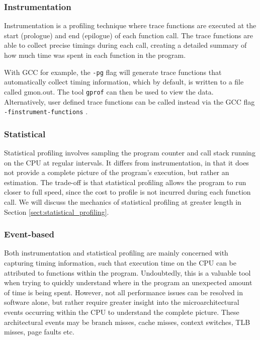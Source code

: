 \subsubsection{Instrumentation}

Instrumentation is a profiling technique where trace functions are executed at the start (prologue) and end (epilogue) of each function call. The trace functions are able to collect precise timings during each call, creating a detailed summary of how much time was spent in each function in the program.

With GCC for example, the \texttt{-pg} flag will generate trace functions that automatically collect timing information, which by default, is written to a file called gmon.out. The tool \texttt{gprof} can then be used to view the data. Alternatively, user defined trace functions can be called instead via the GCC flag \texttt{-finstrument-functions} \cite{ManGCC}. 

\subsubsection{Statistical}\label{sect:statistical}

Statistical profiling involves sampling the program counter and call stack running on the CPU at regular intervals. It differs from instrumentation, in that it does not provide a complete picture of the program's execution, but rather an estimation. The trade-off is that statistical profiling allows the program to run closer to full speed, since the cost to profile is not incurred during each function call. We will discuss the mechanics of statistical profiling at greater length in Section \ref{sect:statistical_profiling}.

\subsubsection{Event-based}

Both instrumentation and statistical profiling are mainly concerned with capturing timing information, such that execution time on the CPU can be attributed to functions within the program. Undoubtedly, this is a valuable tool when trying to quickly understand where in the program an unexpected amount of time is being spent. However, not all performance issues can be resolved in software alone, but rather require greater insight into the microarchitectural events occurring within the CPU to understand the complete picture. These architectural events may be branch misses, cache misses, context switches, TLB misses, page faults etc.

